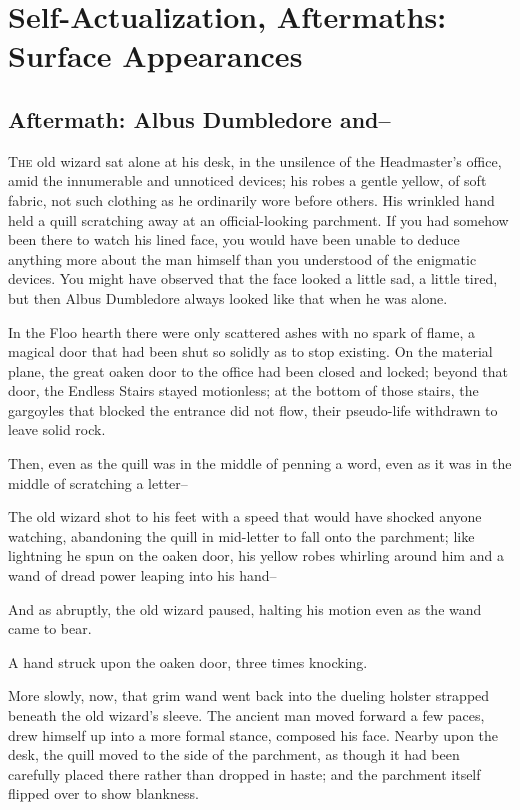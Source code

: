 \chapter{Self-Actualization, Aftermaths: Surface Appearances}

\section{Aftermath: Albus Dumbledore and\---}

\lettrine{T}{he} old wizard sat alone at his desk, in the unsilence of the Headmaster's office, amid the innumerable and unnoticed devices; his robes a gentle yellow, of soft fabric, not such clothing as he ordinarily wore before others. His wrinkled hand held a quill scratching away at an official-looking parchment. If you had somehow been there to watch his lined face, you would have been unable to deduce anything more about the man himself than you understood of the enigmatic devices. You might have observed that the face looked a little sad, a little tired, but then Albus Dumbledore always looked like that when he was alone.

In the Floo hearth there were only scattered ashes with no spark of flame, a magical door that had been shut so solidly as to stop existing. On the material plane, the great oaken door to the office had been closed and locked; beyond that door, the Endless Stairs stayed motionless; at the bottom of those stairs, the gargoyles that blocked the entrance did not flow, their pseudo-life withdrawn to leave solid rock.

Then, even as the quill was in the middle of penning a word, even as it was in the middle of scratching a letter\---

The old wizard shot to his feet with a speed that would have shocked anyone watching, abandoning the quill in mid-letter to fall onto the parchment; like lightning he spun on the oaken door, his yellow robes whirling around him and a wand of dread power leaping into his hand\---

And as abruptly, the old wizard paused, halting his motion even as the wand came to bear.

A hand struck upon the oaken door, three times knocking.

More slowly, now, that grim wand went back into the dueling holster strapped beneath the old wizard's sleeve. The ancient man moved forward a few paces, drew himself up into a more formal stance, composed his face. Nearby upon the desk, the quill moved to the side of the parchment, as though it had been carefully placed there rather than dropped in haste; and the parchment itself flipped over to show blankness.

